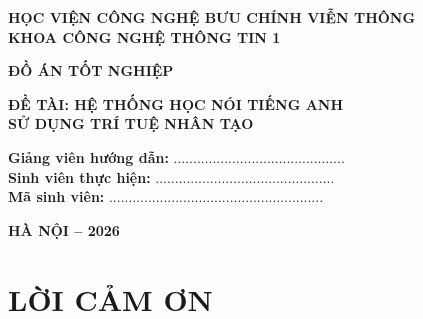 \documentclass[12pt,a4paper,oneside]{report}
\newcommand{\tieudetrang}[1]{\markboth{#1}{}}
\begin{document}

\begin{titlepage}
    \begin{center}

        {\bfseries HỌC VIỆN CÔNG NGHỆ BƯU CHÍNH VIỄN THÔNG}\\[0.3cm]
        {\bfseries KHOA CÔNG NGHỆ THÔNG TIN 1}

        \vspace{2cm}

        {\Large\bfseries ĐỒ ÁN TỐT NGHIỆP}

        \vspace{1.5cm}

        {\Large\bfseries
        ĐỀ TÀI: HỆ THỐNG HỌC NÓI TIẾNG ANH\\
        SỬ DỤNG TRÍ TUỆ NHÂN TẠO}

        \vspace{2cm}

        \begin{flushleft}
            \hspace{2cm}
            \textbf{Giảng viên hướng dẫn:} ............................................\\[0.5cm]

            \hspace{2cm}
            \textbf{Sinh viên thực hiện:} ..............................................\\[0.5cm]

            \hspace{2cm}
            \textbf{Mã sinh viên:} .......................................................
        \end{flushleft}

        \vfill

        {\bfseries HÀ NỘI -- 2026}

    \end{center}
\end{titlepage}

\tieudetrang{}



\chapter*{LỜI CẢM ƠN}
\end{document}
